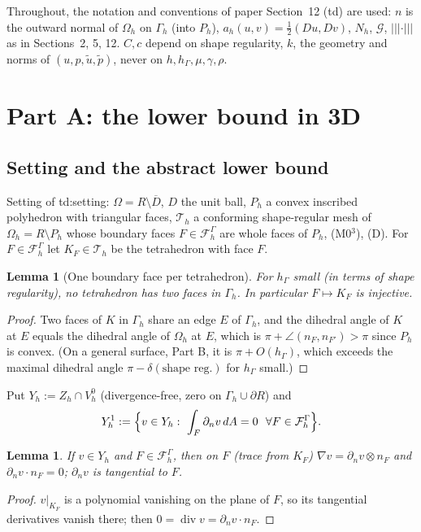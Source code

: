 \documentclass[11pt]{article}
\newtheorem{lemma}[theorem]{Lemma}
\theoremstyle{definition}
\newcommand{\hG}{h_\Gamma}
\newcommand{\Gh}{\Gamma_h}
\newcommand{\Oh}{\Omega_h}
\newcommand{\Th}{\mathcal T_h}
\newcommand{\FG}{\mathcal F_h^\Gamma}
\newcommand{\VO}{V_h^0}
\newcommand{\Zh}{Z_h}
\newcommand{\dn}{\partial_n}
\newcommand{\ut}{\tilde u}
\newcommand{\pt}{\tilde p}
\newcommand{\tnorm}[1]{|\!|\!|#1|\!|\!|}
\renewcommand{\div}{\operatorname{div}}
\newcommand{\Gc}{\mathcal G}
\begin{document}
Throughout, the notation and conventions of paper Section~12 (td) are used: $n$ is the outward normal of $\Oh$ on $\Gh$ (into $P_h$), $a_h(u,v)=\frac12(Du,Dv)$, $N_h$, $\Gc$, $\tnorm\cdot$ as in Sections~2, 5, 12. $C,c$ depend on shape regularity, $k$, the geometry and norms of $(u,p,\ut,\pt)$, never on $h,\hG,\mu,\gamma,\rho$.

\section{Part A: the lower bound in 3D}\label{A:sec}

\subsection{Setting and the abstract lower bound}
Setting of td:setting: $\Omega=R\setminus\overline D$, $D$ the unit ball, $P_h$ a convex inscribed polyhedron with triangular faces, $\Th$ a conforming shape-regular mesh of $\Oh=R\setminus P_h$ whose boundary faces $F\in\FG$ are whole faces of $P_h$, (M0$^3$), (D). For $F\in\FG$ let $K_F\in\Th$ be the tetrahedron with face $F$.

\begin{lemma}[One boundary face per tetrahedron]\label{A:one}
For $\hG$ small (in terms of shape regularity), no tetrahedron has two faces in $\Gh$. In particular $F\mapsto K_F$ is injective.
\end{lemma}
\begin{proof}
Two faces of $K$ in $\Gh$ share an edge $E$ of $\Gh$, and the dihedral angle of $K$ at $E$ equals the dihedral angle of $\Oh$ at $E$, which is $\pi+\angle(n_F,n_{F'})>\pi$ since $P_h$ is convex. (On a general surface, Part B, it is $\pi+O(\hG)$, which exceeds the maximal dihedral angle $\pi-\delta(\text{shape reg.})$ for $\hG$ small.)
\end{proof}

Put $Y_h:=\Zh\cap\VO$ (divergence-free, zero on $\Gh\cup\partial R$) and
\[
Y_h^1:=\Bigl\{v\in Y_h:\ \int_F\dn v\,dA=0\ \ \forall F\in\FG\Bigr\}.
\]

\begin{lemma}\label{A:normal}
If $v\in Y_h$ and $F\in\FG$, then on $F$ (trace from $K_F$) $\nabla v=\dn v\otimes n_F$ and $\dn v\cdot n_F=0$; $\dn v$ is tangential to $F$.
\end{lemma}
\begin{proof}
$v|_{K_F}$ is a polynomial vanishing on the plane of $F$, so its tangential derivatives vanish there; then $0=\div v=\dn v\cdot n_F$.
\end{proof}
\end{document}
